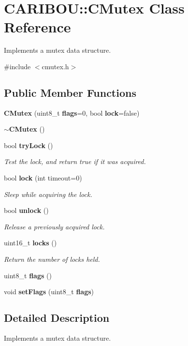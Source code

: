 \section{C\-A\-R\-I\-B\-O\-U\-:\-:C\-Mutex Class Reference}
\label{class_c_a_r_i_b_o_u_1_1_c_mutex}


Implements a mutex data structure.  




{\ttfamily \#include $<$cmutex.\-h$>$}

\subsection*{Public Member Functions}
\begin{DoxyCompactItemize}
\item 
{\bf C\-Mutex} (uint8\-\_\-t {\bf flags}=0, bool {\bf lock}=false)
\item 
{\bf $\sim$\-C\-Mutex} ()
\item 
bool {\bf try\-Lock} ()
\begin{DoxyCompactList}\small\item\em Test the lock, and return true if it was acquired. \end{DoxyCompactList}\item 
bool {\bf lock} (int timeout=0)
\begin{DoxyCompactList}\small\item\em Sleep while acquiring the lock. \end{DoxyCompactList}\item 
bool {\bf unlock} ()
\begin{DoxyCompactList}\small\item\em Release a previously acquired lock. \end{DoxyCompactList}\item 
uint16\-\_\-t {\bf locks} ()
\begin{DoxyCompactList}\small\item\em Return the number of locks held. \end{DoxyCompactList}\item 
uint8\-\_\-t {\bf flags} ()
\item 
void {\bf set\-Flags} (uint8\-\_\-t {\bf flags})
\end{DoxyCompactItemize}


\subsection{Detailed Description}
Implements a mutex data structure. 

